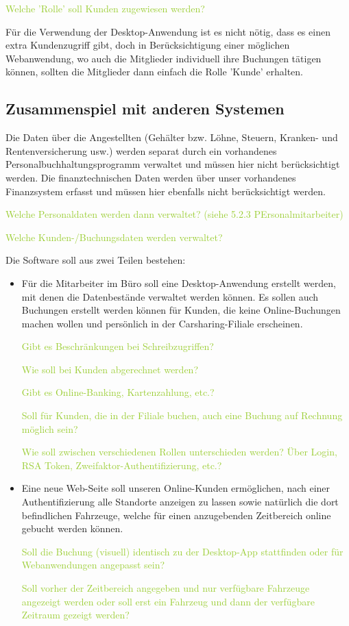 \textcolor{YellowGreen}{Welche 'Rolle' soll Kunden zugewiesen werden?}

\textcolor{NavyBlue}{Für die Verwendung der Desktop-Anwendung ist es nicht nötig, dass es einen extra Kundenzugriff gibt, doch in Berücksichtigung einer möglichen Webanwendung, wo auch die Mitglieder individuell ihre Buchungen tätigen können, sollten die Mitglieder dann einfach die Rolle 'Kunde' erhalten.}


\subsection{Zusammenspiel mit anderen Systemen}

Die Daten über die Angestellten (Gehälter bzw. Löhne, Steuern, Kranken- und Rentenversicherung usw.) werden separat durch ein vorhandenes Personalbuchhaltungsprogramm verwaltet und müssen hier nicht berücksichtigt werden. Die finanztechnischen Daten werden über unser vorhandenes Finanzsystem erfasst und müssen hier ebenfalls nicht berücksichtigt werden. 

\textcolor{YellowGreen}{Welche Personaldaten werden dann verwaltet? (siehe 5.2.3 PErsonalmitarbeiter)}

\textcolor{YellowGreen}{Welche Kunden-/Buchungsdaten werden verwaltet?}

Die Software soll aus zwei Teilen bestehen:  

\begin{itemize}
    \item Für die Mitarbeiter im Büro soll eine Desktop-Anwendung erstellt werden, mit denen die Datenbestände verwaltet werden können. Es sollen auch Buchungen erstellt werden können für Kunden, die keine Online-Buchungen machen wollen und persönlich in der Carsharing-Filiale erscheinen. 
    
    \textcolor{YellowGreen}{Gibt es Beschränkungen bei Schreibzugriffen?}

    \textcolor{YellowGreen}{Wie soll bei Kunden abgerechnet werden?}

    \textcolor{YellowGreen}{Gibt es Online-Banking, Kartenzahlung, etc.?}

    \textcolor{YellowGreen}{Soll für Kunden, die in der Filiale buchen, auch eine Buchung auf Rechnung möglich sein?}

    \textcolor{YellowGreen}{Wie soll zwischen verschiedenen Rollen unterschieden werden? Über Login, RSA Token, Zweifaktor-Authentifizierung, etc.?}

    \item Eine neue Web-Seite soll unseren Online-Kunden ermöglichen, nach einer Authentifizierung alle Standorte anzeigen zu lassen sowie natürlich die dort befindlichen Fahrzeuge, welche für einen anzugebenden Zeitbereich online gebucht werden können. 
    
    \textcolor{YellowGreen}{Soll die Buchung (visuell) identisch zu der Desktop-App stattfinden oder für Webanwendungen angepasst sein?}

    \textcolor{YellowGreen}{Soll vorher der Zeitbereich angegeben und nur verfügbare Fahrzeuge angezeigt werden oder soll erst ein Fahrzeug und dann der verfügbare Zeitraum gezeigt werden?}
\end{itemize}

